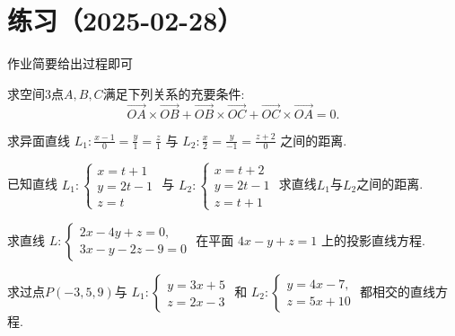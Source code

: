 \section{练习（2025-02-28）}

作业简要给出过程即可
\begin{exercise}\label{exe:1.5}
    求空间3点\(A,B,C\)满足下列关系的充要条件:
\[
\overrightarrow{OA}\times\overrightarrow{OB}+\overrightarrow{OB}\times\overrightarrow{OC}+\overrightarrow{OC}\times\overrightarrow{OA}=0.
\]
\end{exercise}
\begin{exercise}\label{exe:1.1}
    求异面直线 \(L_{1}:\frac{x-1}{0}=\frac{y}{1}=\frac{z}{1}\) 与 \(L_{2}:\frac{x}{2}=\frac{y}{-1}=\frac{z+2}{0}\) 之间的距离.
\end{exercise}

\begin{exercise}\label{exe:1.2}
    已知直线 \(L_{1}:\begin{cases} x=t+1 \\ y=2t-1 \\ z=t \end{cases}\) 与 \(L_{2}:\begin{cases} x=t+2 \\ y=2t-1 \\ z=t+1 \end{cases}\) 求直线\(L_{1}\)与\(L_{2}\)之间的距离.
\end{exercise}

\begin{exercise}\label{exe:1.3}
    求直线 \(L:\begin{cases}2x-4y+z=0,\\ 3x-y-2z-9=0\end{cases}\) 在平面 \(4x-y+z=1\) 上的投影直线方程.
\end{exercise}
\begin{exercise}\label{exe:1.4}
    求过点$P(-3,5,9)$与
\(L_{1}:\begin{cases}y=3x+5\\ z=2x-3\end{cases}\)
和
\(L_{2}:\begin{cases}y=4x-7,\\ z=5x+10\end{cases}\)
都相交的直线方程.
\end{exercise}

